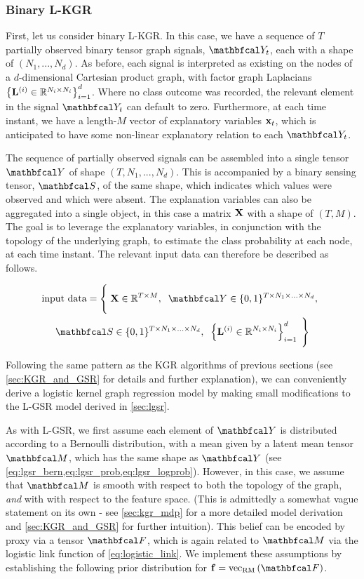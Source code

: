 \subsubsection{Binary L-KGR}

First, let us consider binary L-KGR. In this case, we have a sequence of $T$ partially observed binary tensor graph signals, $\Yt_t$, each with a shape of $(N_1, ..., N_d)$. As before, each signal is interpreted as existing on the nodes of a $d$-dimensional Cartesian product graph, with factor graph Laplacians $\left\{\mathbf{L}^{(i)} \in \mathbb{R}^{N_i \times N_i}\right\}_{i=1}^d$. Where no class outcome was recorded, the relevant element in the signal $\Yt_t$ can default to zero. Furthermore, at each time instant, we have a length-$M$ vector of explanatory variables $\mathbf{x}_t$, which is anticipated to have some non-linear explanatory relation to each $\Yt_t$.

The sequence of partially observed signals can be assembled into a single tensor $\Yt$ of shape $(T, N_1, ..., N_d)$. This is accompanied by a binary sensing tensor, $\St$, of the same shape, which indicates which values were observed and which were absent. The explanation variables can also be aggregated into a single object, in this case a matrix $\mathbf{X}$ with a shape of $(T, M)$. The goal is to leverage the explanatory variables, in conjunction with the topology of the underlying graph, to estimate the class probability at each node, at each time instant. The relevant input data can therefore be described as follows. 


\begin{multline*}
    \text{input data} = \Bigg\{\;\X \in \R^{T \times M}, \;\; \Yt \in \{0, 1\}^{T \times N_1 \times ... \times N_d}, \;\; \\ 
    \St \in \{0, 1\}^{T \times N_1 \times ... \times N_d} , \;\; \left\{\LL^{(i)} \in \R^{N_i \times N_i}\right\}_{i=1}^d \; \Bigg\}
\end{multline*}

Following the same pattern as the KGR algorithms of previous sections (see \cref{sec:KGR_and_GSR} for details and further explanation), we can conveniently derive a logistic kernel graph regression model by making small modifications to the L-GSR model derived in \cref{sec:lgsr}.  

As with L-GSR, we first assume each element of $\Yt$ is distributed according to a Bernoulli distribution, with a mean given by a latent mean tensor $\Mt$, which has the same shape as $\Yt$ (see \cref{eq:lgsr_bern,eq:lgsr_prob,eq:lgsr_logprob}). However, in this case, we assume that $\Mt$ is smooth with respect to both the topology of the graph, \textit{and} with with respect to the feature space. (This is admittedly a somewhat vague statement on its own - see \cref{sec:kgr_mdp} for a more detailed model derivation and \cref{sec:KGR_and_GSR} for further intuition). This belief can be encoded by proxy via a tensor $\Ft$, which is again related to $\Mt$ via the logistic link function of \cref{eq:logistic_link}. We implement these assumptions by establishing the following prior distribution for $\f = \vecrm{\Ft}$.

